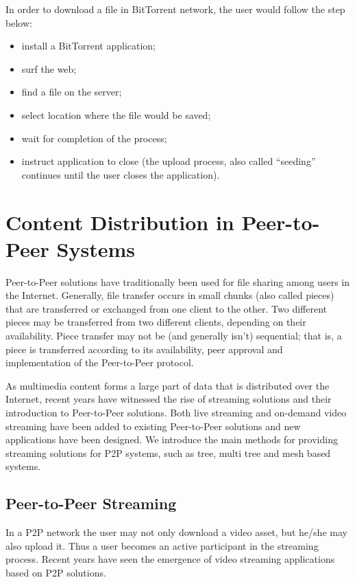 In order to download a file in BitTorrent network, the user would follow the
step below:

\begin{itemize}
  \item install a BitTorrent application;
  \item surf the web;
  \item find a file on the server;
  \item select location where the file would be saved;
  \item wait for completion of the process;
  \item instruct application to close (the upload process, also called
  ``seeding'' continues until the user closes the application).
\end{itemize}

\section{Content Distribution in Peer-to-Peer Systems}
\label{sec:p2p-systems:streaming}

Peer-to-Peer solutions have traditionally been used for file sharing among
users in the Internet. Generally, file transfer occurs in small chunks (also
called pieces) that are transferred or exchanged from one client to the other.
Two different pieces may be transferred from two different clients, depending
on their availability. Piece transfer may not be (and generally isn't)
sequential; that is, a piece is transferred according to its availability,
peer approval and implementation of the Peer-to-Peer protocol.

As multimedia content forms a large part of data that is distributed over the
Internet, recent years have witnessed the rise of streaming solutions and
their introduction to Peer-to-Peer solutions. Both live streaming and
on-demand video streaming have been added to existing Peer-to-Peer solutions
and new applications have been designed. We introduce the main methods for
providing streaming solutions for P2P systems, such as tree, multi tree and
mesh based systems.

\subsection{Peer-to-Peer Streaming}
\label{subsec:p2p-systems:p2p-streaming-p2p}

In a P2P network the user may not only download a video asset, but he/she may
also upload it. Thus a user becomes an active participant in the streaming
process. Recent years have seen the emergence of video streaming applications
based on P2P solutions.

